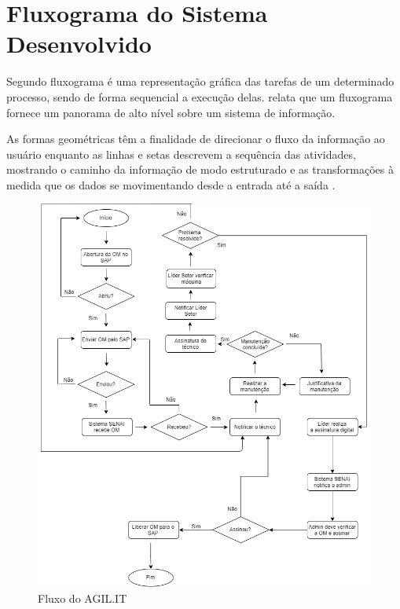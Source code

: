 \section{Fluxograma do Sistema Desenvolvido}

Segundo \cite{pejeronimo2002} fluxograma é uma representação gráfica das tarefas de um determinado processo, sendo de forma sequencial a execução delas. \cite{roberthurt} relata que um fluxograma fornece um panorama de alto nível sobre um sistema de informação.

As formas geométricas têm a finalidade de direcionar o fluxo da informação ao usuário enquanto as linhas e setas descrevem a sequência das atividades, mostrando o caminho da informação de modo estruturado e as transformações à medida que os dados se movimentando desde a entrada até a saída \cite{souza2017desenvolvimento}.

\begin{figure}[H]
	\caption{\label{flux_sys}Fluxo do AGIL.IT}
	\begin{center}
		\includegraphics[scale=0.55]{./Figuras/fluxo-sistema.png}
	\end{center}
\end{figure}

